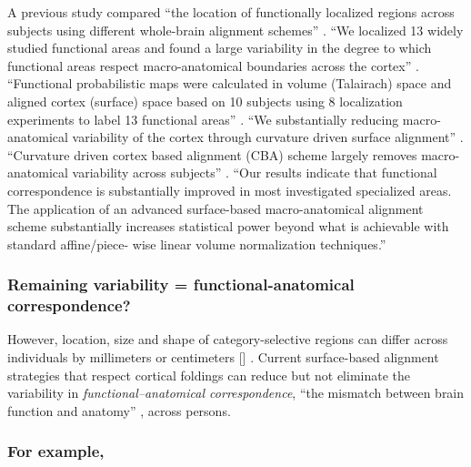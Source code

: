 A previous study compared ``the location of functionally localized regions
across subjects using different whole-brain alignment schemes''
\citep{frost2012measuring}.
%
``We localized 13 widely studied functional areas and found a large variability
in the degree to which functional areas respect macro-anatomical boundaries
across the cortex'' \citep{frost2012measuring}.
%
``Functional probabilistic maps were calculated in volume (Talairach) space and
aligned cortex (surface) space based on 10 subjects using 8 localization
experiments to label 13 functional areas'' \citep{frost2012measuring}.
%
``We substantially reducing macro-anatomical variability of the cortex through
curvature driven surface alignment'' \citep{frost2012measuring}.
%
``Curvature driven cortex based alignment (CBA) scheme largely removes
macro-anatomical variability across subjects'' \citep{frost2012measuring}.
%
``Our results indicate that functional correspondence is substantially improved
in most investigated specialized areas.
%
The application of an advanced surface-based macro-anatomical alignment scheme
substantially increases statistical power beyond what is achievable with
standard affine/piece- wise linear volume normalization techniques.''
\citep{frost2012measuring}



\subsubsection{Remaining variability = functional-anatomical correspondence?}


However, location, size and shape of category-selective regions can differ
across individuals by millimeters or centimeters [\citep{zhen2017quantifying,
zhen2015quantifying}] \citep{feilong2018reliable}.
Current surface-based alignment strategies that respect cortical foldings
\citep{fischl2012freesurfer, yeo2009spherical} can reduce but not eliminate
\citep[e.g.,][]{coalson2018impact, benson2014correction, natu2021sulcal,
wang2015probabilistic, frost2012measuring, langers2014assessment, weiner2014mid,
rosenke2021probabilistic} the variability in \textit{functional--anatomical
correspondence}, ``the mismatch between brain function and anatomy''
\citep{feilong2018reliable}, across persons.


\subsubsection{For example, \citet{rosenke2021probabilistic}}

